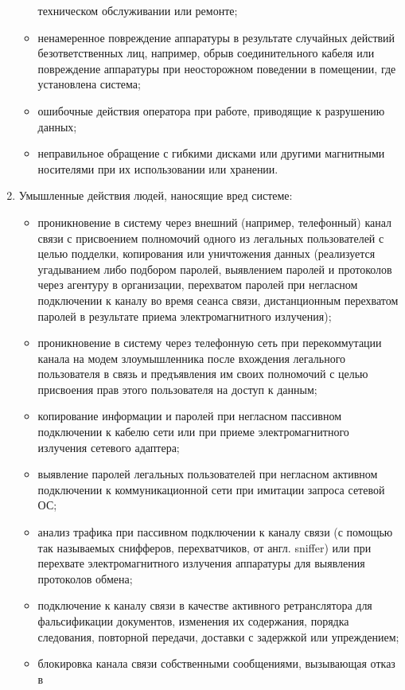 \begin{enumerate}
\begin{itemize}
техническом обслуживании или ремонте; 
	\item ненамеренное повреждение аппаратуры в результате случайных действий
	безответственных лиц, например, обрыв соединительного кабеля или повреждение
	аппаратуры при неосторожном поведении в помещении, где установлена система;
	\item ошибочные действия оператора при работе, приводящие к разрушению данных;
	\item неправильное обращение с гибкими дисками или другими магнитными
	носителями при их использовании или хранении.
  \end{itemize}
  \item Умышленные действия людей, наносящие вред системе: 
    \begin{itemize}
    \item проникновение в систему через внешний (например, телефонный) канал
    связи с присвоением полномочий одного из легальных пользователей с целью
    подделки, копирования или уничтожения данных (реализуется угадыванием либо
    подбором паролей, выявлением паролей и протоколов через агентуру в
    организации, перехватом паролей при негласном подключении к каналу во время
    сеанса связи, дистанционным перехватом паролей в результате приема
    электромагнитного излучения);
	\item проникновение в систему через телефонную сеть при перекоммутации канала
	на модем злоумышленника после вхождения легального пользователя в связь и
	предъявления им своих полномочий с целью присвоения прав этого пользователя на
	доступ к данным;
	\item копирование информации и паролей при негласном пассивном подключении к
	кабелю сети или при приеме электромагнитного излучения сетевого адаптера; 
	\item выявление паролей легальных пользователей при негласном активном
	подключении к коммуникационной сети при имитации запроса сетевой ОС; 
	\item анализ трафика при пассивном подключении к каналу связи (с помощью так
	называемых снифферов, перехватчиков, от англ. sniffer) или при перехвате
	электромагнитного излучения аппаратуры для выявления протоколов обмена;
	\item подключение к каналу связи в качестве активного ретранслятора для
	фальсификации документов, изменения их содержания, порядка следования,
	повторной передачи, доставки с задержкой или упреждением;
	\item блокировка канала связи собственными сообщениями, вызывающая отказ в

\end{itemize}
\end{enumerate}
